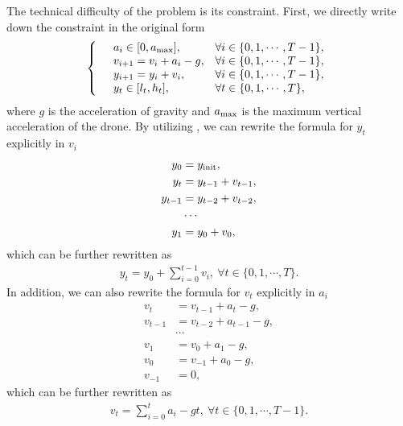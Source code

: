 \documentclass[letterpaper,11pt]{article}
\begin{document}
The technical difficulty of the problem is its constraint.
First, we directly write down the constraint in the original form
\begin{equation}
    \label{eq:original-constraint}
    \left\{
    \begin{array}{llll}
        & a_i \in [0, a_{\rm max}], & \forall i\in \{0,1,\cdots,T-1\},\\
        & v_{i+1} = v_i + a_i - g, & \forall i\in \{0,1,\cdots,T-1\},\\
        & y_{i+1} = y_i + v_i, & \forall i\in \{0,1,\cdots,T-1\},\\
        & y_{t} \in [l_t, h_t], & \forall t\in \{0,1,\cdots,T\},
    \end{array}\right.
\end{equation}
where $g$ is the acceleration of gravity and $a_{\rm max}$ is the maximum vertical acceleration of the drone.
By utilizing , we can rewrite the formula for $y_t$ explicitly in $v_i$
\begin{equation}
    \begin{split}
        y_0 &= y_{\rm init},\\
        y_t &= y_{t-1} + v_{t-1},\\
        y_{t-1} &= y_{t-2} + v_{t-2},\\
        &\cdots\\
        y_1 &= y_0 + v_0,
    \end{split}
\end{equation}
which can be further rewritten as
\begin{align}
    \label{eq:yt}
    y_t = y_0 + \sum_{i=0}^{t-1} v_i,~\forall t\in \{0,1,\cdots,T\}.
\end{align}
In addition, we can also rewrite the formula for $v_t$ explicitly in $a_i$
\begin{equation}
    \begin{split}
        v_t &= v_{t-1} + a_{t} - g,\\
        v_{t-1} &= v_{t-2} + a_{t-1} - g,\\
        &\cdots\\
        v_1 &= v_0 + a_1 - g,\\
        v_0 &= v_{-1} + a_0 - g,\\
        v_{-1} &= 0,
    \end{split}
\end{equation}
which can be further rewritten as
\begin{align}
    \label{eq:vt}
    v_t = \sum_{i=0}^{t} a_i - g t,~\forall t\in \{0,1,\cdots,T-1\}.
\end{align}
\end{document}
